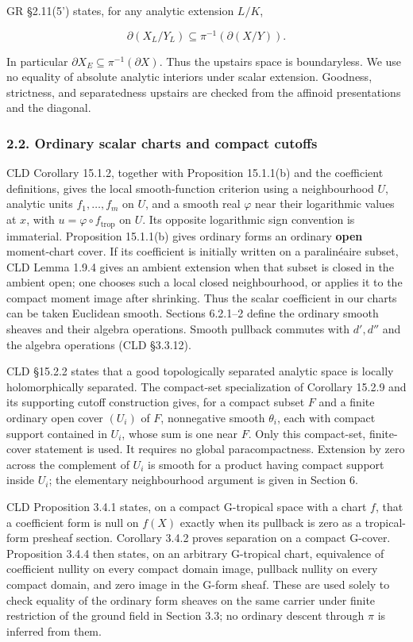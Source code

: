 \documentclass[
  11pt,
]{article}
\begin{document}
GR §2.11(5') states, for any analytic extension \(L/K\),

\[\partial(X_L/Y_L)\subseteq\pi^{-1}(\partial(X/Y)).\]

In particular \(\partial X_E\subseteq\pi^{-1}(\partial X)\). Thus the
upstairs space is boundaryless. We use no equality of absolute analytic
interiors under scalar extension. Goodness, strictness, and
separatedness upstairs are checked from the affinoid presentations and
the diagonal.

\subsubsection{2.2. Ordinary scalar charts and compact
cutoffs}\label{ordinary-scalar-charts-and-compact-cutoffs}

CLD Corollary 15.1.2, together with Proposition 15.1.1(b) and the
coefficient definitions, gives the local smooth-function criterion using a
neighbourhood \(U\), analytic units \(f_1,\ldots,f_m\) on \(U\), and a
smooth real \(\varphi\) near their logarithmic values at \(x\), with
\(u=\varphi\circ f_{\mathrm{trop}}\) on \(U\). Its opposite logarithmic
sign convention is immaterial. Proposition 15.1.1(b) gives ordinary
forms an ordinary \textbf{open} moment-chart cover. If its coefficient
is initially written on a paralinéaire subset, CLD Lemma 1.9.4 gives an
ambient extension when that subset is closed in the ambient open; one
chooses such a local closed neighbourhood, or applies it to the compact
moment image after shrinking. Thus the scalar coefficient in our charts
can be taken Euclidean smooth. Sections 6.2.1--2 define the ordinary
smooth sheaves and their algebra operations. Smooth pullback commutes
with \(d',d''\) and the algebra operations (CLD §3.3.12).

CLD §15.2.2 states that a good topologically separated analytic space is
locally holomorphically separated. The compact-set specialization of
Corollary 15.2.9 and its supporting cutoff construction gives, for a
compact subset \(F\) and a finite ordinary open cover \((U_i)\) of
\(F\), nonnegative smooth \(\theta_i\), each with compact support
contained in \(U_i\), whose sum is one near \(F\). Only this
compact-set, finite-cover statement is used. It requires no global
paracompactness. Extension by
zero across the complement of \(U_i\) is smooth for a product having
compact support inside \(U_i\); the elementary neighbourhood argument is
given in Section 6.

CLD Proposition 3.4.1 states, on a compact G-tropical space with a chart
\(f\), that a coefficient form is null on \(f(X)\) exactly when its
pullback is zero as a tropical-form presheaf section. Corollary 3.4.2
proves separation on a compact G-cover. Proposition 3.4.4 then states,
on an arbitrary G-tropical chart, equivalence of coefficient nullity on
every compact domain image, pullback nullity on every compact domain,
and zero image in the G-form sheaf. These are used solely to check
equality of the ordinary form sheaves on the same carrier under finite
restriction of the ground field in Section 3.3; no ordinary descent
through \(\pi\) is inferred from them.
\end{document}
